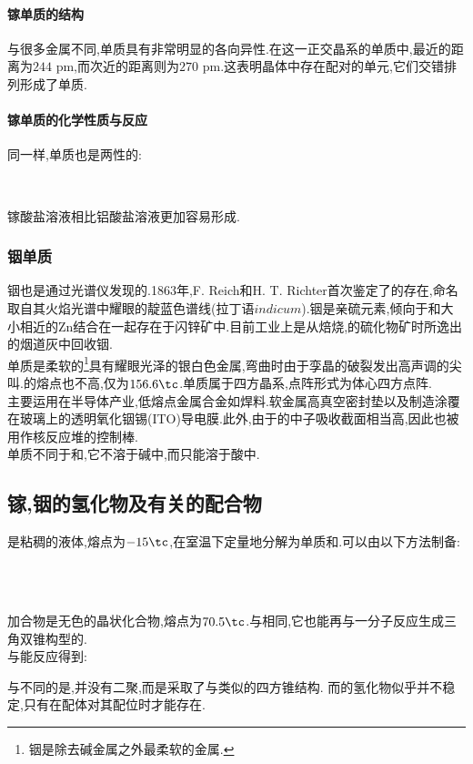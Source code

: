 \documentclass{ctexart}
\begin{document}
\paragraph{镓单质的结构}
与很多金属不同,单质具有非常明显的各向异性.在这一正交晶系的单质中,最近的距离为$244\text{ pm}$,而次近的距离则为$270\text{ pm}$.这表明晶体中存在配对的单元,它们交错排列形成了单质.
\paragraph{镓单质的化学性质与反应}
同一样,单质也是两性的:
\begin{center}
    \\
\end{center}
镓酸盐溶液相比铝酸盐溶液更加容易形成.
\subsubsection{铟单质}
铟也是通过光谱仪发现的.1863年,F. Reich和H. T. Richter首次鉴定了的存在,命名取自其火焰光谱中耀眼的靛蓝色谱线(拉丁语$indicum$).铟是亲硫元素,倾向于和大小相近的Zn结合在一起存在于闪锌矿中.目前工业上是从焙烧,的硫化物矿时所逸出的烟道灰中回收铟.\\
\indent {}单质是柔软的\footnote{铟是除去碱金属之外最柔软的金属.}具有耀眼光泽的银白色金属,弯曲时由于孪晶的破裂发出高声调的尖叫.的熔点也不高,仅为$156.6\tc$.单质属于四方晶系,点阵形式为体心四方点阵.\\
\indent {}主要运用在半导体产业,低熔点金属合金如焊料.软金属高真空密封垫以及制造涂覆在玻璃上的透明氧化铟锡(ITO)导电膜.此外,由于的中子吸收截面相当高,因此也被用作核反应堆的控制棒.\\
\indent {}单质不同于和,它不溶于碱中,而只能溶于酸中.
\subsection{镓,铟的氢化物及有关的配合物}
是粘稠的液体,熔点为$-15\tc$,在室温下定量地分解为单质和.可以由以下方法制备:
\begin{center}
    \\
    \\
\end{center}
加合物是无色的晶状化合物,熔点为$70.5\tc$.与相同,它也能再与一分子反应生成三角双锥构型的.\\
\indent {}与能反应得到:
\begin{center}
\end{center}
与不同的是,并没有二聚,而是采取了与类似的四方锥结构.
而的氢化物似乎并不稳定,只有在配体对其配位时才能存在.
\end{document}
